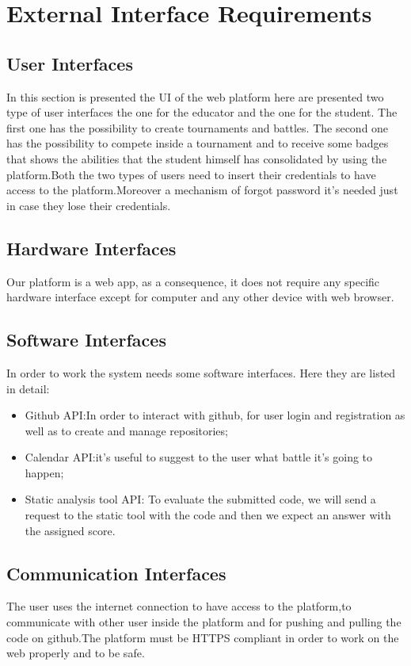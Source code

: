 \section{External Interface Requirements}
\subsection{User Interfaces}
In this section is presented the UI of the web platform here are presented two type of user interfaces the one for the educator and the one for the student. The first one has the possibility to create tournaments and battles.
The second one has the possibility to compete inside a tournament and to receive some badges that shows the abilities that the student himself has consolidated by using the platform.Both the two types of users  need to insert their credentials to have access to the platform.Moreover a mechanism of forgot password it's needed just in case they lose their credentials. 
\subsection{Hardware Interfaces}
Our platform is a web app, as a consequence, it does not require any specific hardware interface except for computer and any other device with web browser.
\subsection{Software Interfaces}
In order to work the system needs some software  interfaces. Here they are listed in detail:
    \begin{itemize}
        \item Github API:In order to interact with github, for user login and registration as well as to create and manage repositories;
        \item Calendar API:it's useful to suggest to the user what battle it's going to happen;
        \item Static analysis tool API: To evaluate the submitted code, we will send a request to the static tool with the code and then we expect an answer with the assigned score.
    \end{itemize}
\subsection{Communication Interfaces}
The user uses the internet connection to have access to the platform,to communicate with other user inside the platform and for pushing and pulling the code on github.The platform must be HTTPS compliant in order to work on the web properly and to be safe. 

